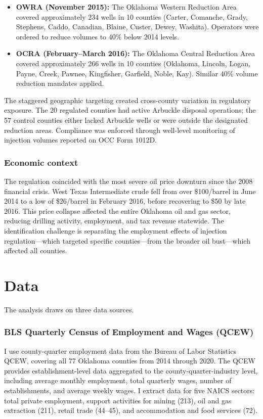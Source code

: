 \documentclass[12pt]{article}
\begin{document}
\begin{itemize}
\item \textbf{OWRA (November 2015):} The Oklahoma Western Reduction Area covered approximately 234 wells in 10 counties (Carter, Comanche, Grady, Stephens, Caddo, Canadian, Blaine, Custer, Dewey, Washita). Operators were ordered to reduce volumes to 40\% below 2014 levels.

\item \textbf{OCRA (February--March 2016):} The Oklahoma Central Reduction Area covered approximately 266 wells in 10 counties (Oklahoma, Lincoln, Logan, Payne, Creek, Pawnee, Kingfisher, Garfield, Noble, Kay). Similar 40\% volume reduction mandates applied.
\end{itemize}

The staggered geographic targeting created cross-county variation in regulatory exposure. The 20 regulated counties had active Arbuckle disposal operations; the 57 control counties either lacked Arbuckle wells or were outside the designated reduction areas. Compliance was enforced through well-level monitoring of injection volumes reported on OCC Form 1012D.

\subsubsection*{Economic context} The regulation coincided with the most severe oil price downturn since the 2008 financial crisis. West Texas Intermediate crude fell from over \$100/barrel in June 2014 to a low of \$26/barrel in February 2016, before recovering to \$50 by late 2016. This price collapse affected the entire Oklahoma oil and gas sector, reducing drilling activity, employment, and tax revenue statewide. The identification challenge is separating the employment effects of injection regulation---which targeted specific counties---from the broader oil bust---which affected all counties.


\section{Data}

The analysis draws on three data sources.

\subsubsection*{BLS Quarterly Census of Employment and Wages (QCEW)} I use county-quarter employment data from the Bureau of Labor Statistics QCEW, covering all 77 Oklahoma counties from 2014 through 2020. The QCEW provides establishment-level data aggregated to the county-quarter-industry level, including average monthly employment, total quarterly wages, number of establishments, and average weekly wages. I extract data for five NAICS sectors: total private employment, support activities for mining (213), oil and gas extraction (211), retail trade (44--45), and accommodation and food services (72).
\end{document}
